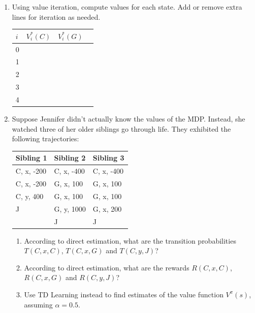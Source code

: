 \documentclass[12pt]{article}
\begin{document}
\begin{enumerate}

\item Using value iteration, compute values for each state.  Add or
  remove extra lines for iteration as needed.

\begin{center}
\begin{tabular}{|l|c|c|c|} \hline
$i$ & $V_i^*(C)$ & $V_i^*(G)$ \\ \hline
0   &            &           \\ \hline
1   &            &           \\ \hline
2   &            &           \\ \hline
3   &            &           \\ \hline
4   &            &           \\ \hline
\end{tabular}
\end{center}

\item Suppose Jennifer didn't actually know the values of the MDP.
  Instead, she watched three of her older siblings go through life.
  They exhibited the following trajectories:

\begin{center}
\begin{tabular}{|l|l|l|} \hline
{\bf Sibling 1} & {\bf Sibling 2} & {\bf Sibling 3} \\ \hline
    C, x, -200 & C, x, -400 & C, x, -400 \\
    C, x, -200 & G, x,  100 & G, x,  100 \\
    C, y,  400 & G, x,  100 & G, x,  100 \\
    J          & G, y, 1000 & G, x,  200 \\
               & J          & J          \\ \hline
\end{tabular}
\end{center}

  \begin{enumerate}

  \item According to direct estimation, what are the transition
    probabilities $T(C,x,C)$, $T(C,x,G)$ and $T(C,y,J)$?

  \item According to direct estimation, what are the rewards
    $R(C,x,C)$, $R(C,x,G)$ and $R(C,y,J)$?

  \item Use TD Learning instead to find estimates of the value
    function $V^{\pi}(s)$, assuming $\alpha=0.5$.

  \end{enumerate}

\end{enumerate}
\end{document}
